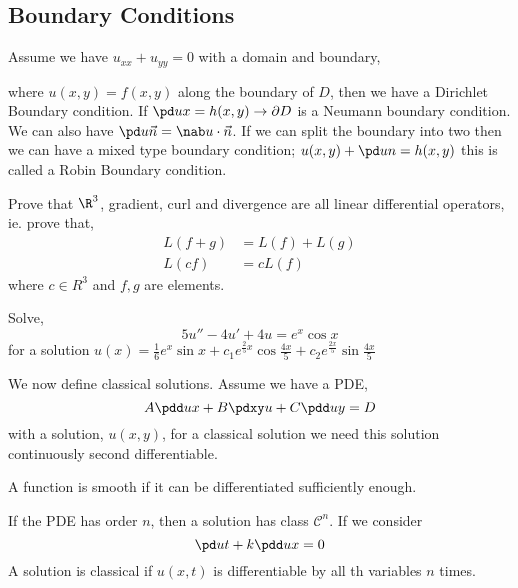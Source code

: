 \subsection{Boundary Conditions}
Assume we have $u_{xx} + u_{yy} = 0$ with a domain and boundary,

\begin{figure}[!ht]
\centering
{}
\end{figure}

where $u(x, y) = f(x, y)$ along the boundary of $D$, then we have a Dirichlet Boundary condition. If $\pd u x = h(x, y) \to \partial D$ is a Neumann boundary condition. We can also have $\pd u {\vec n} = \nab u \cdot \vec n$. If we can split the boundary into two then we can have a mixed type boundary condition; $u(x, y) + \pd u n = h(x, y)$ this is called a Robin Boundary condition.

\begin{exercise}
  Prove that $\R^3$, gradient, curl and divergence are all linear differential operators, ie. prove that,
  \begin{align*}
    L(f + g) &= L(f) + L(g)\\
    L(cf) &= cL(f)
  \end{align*}
  where $c \in R^3$ and $f, g$ are elements.
\end{exercise}
\begin{exercise}
  Solve,
  $$ 5u'' - 4u' + 4u = e^x\cos x $$
  for a solution $u(x) = \frac{1}{6}e^x\sin x + c_1e^{\frac{2}{5}x}\cos \frac{4x}{5} + c_2e^{\frac{2x}{5}}\sin \frac{4x}{5}$
\end{exercise}


We now define classical solutions. Assume we have a PDE,
$$ A\pdd u x + B\pdxy u + C\pdd u y = D $$
with a solution, $u(x, y)$, for a classical solution we need this solution continuously second differentiable.

\begin{ndefi}[Smooth]
  A function is smooth if it can be differentiated sufficiently enough.
\end{ndefi}

If the PDE has order $n$, then a solution has class $\mathcal{C}^n$. If we consider
$$ \pd u t + k\pdd u x = 0 $$
A solution is classical if $u(x, t)$ is differentiable by all th variables $n$ times.

